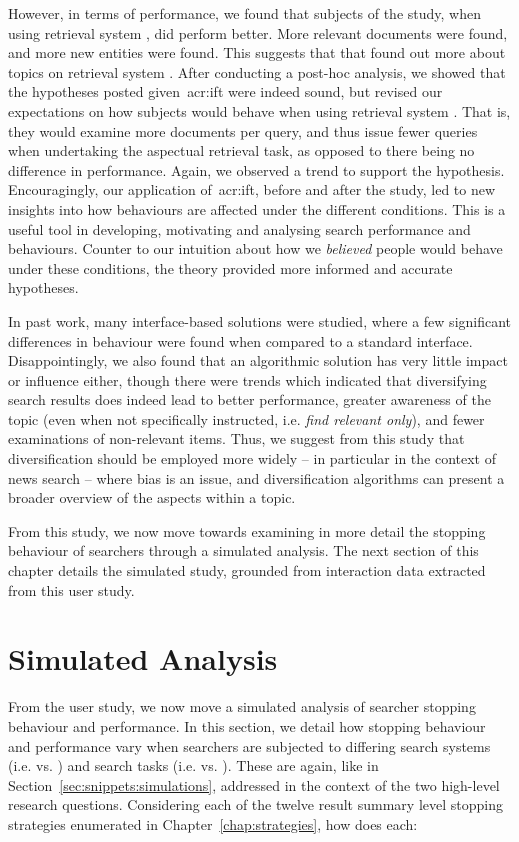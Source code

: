However, in terms of performance, we found that subjects of the study, when using retrieval system , did perform better. More relevant documents were found, and more new entities were found. This suggests that that found out more about topics on retrieval system . After conducting a post-hoc analysis, we showed that the hypotheses posted given~\gls{acr:ift} were indeed sound, but revised our expectations on how subjects would behave when using retrieval system . That is, they would examine more documents per query, and thus issue fewer queries when undertaking the aspectual retrieval task, as opposed to there being no difference in performance. Again, we observed a trend to support the hypothesis. Encouragingly, our application of~\gls{acr:ift}, before and after the study, led to new insights into how behaviours are affected under the different conditions. This is a useful tool in developing, motivating and analysing search performance and behaviours. Counter to our intuition about how we \emph{believed} people would behave under these conditions, the theory provided more informed and accurate hypotheses.

In past work, many interface-based solutions were studied, where a few significant differences in behaviour were found when compared to a standard interface. Disappointingly, we also found that an algorithmic solution has very little impact or influence either, though there were trends which indicated that diversifying search results does indeed lead to better performance, greater awareness of the topic (even when not specifically instructed, i.e. \emph{find relevant only}), and fewer examinations of non-relevant items. Thus, we suggest from this study that diversification should be employed more widely -- in particular in the context of news search -- where bias is an issue, and diversification algorithms can present a broader overview of the aspects within a topic.

From this study, we now move towards examining in more detail the stopping behaviour of searchers through a simulated analysis. The next section of this chapter details the simulated study, grounded from interaction data extracted from this user study.

\section{Simulated Analysis}\label{sec:diversity:simulated}
From the user study, we now move a simulated analysis of searcher stopping behaviour and performance. In this section, we detail how stopping behaviour and performance vary when searchers are subjected to differing search systems (i.e.  vs. ) and search tasks (i.e.  vs. ). These are again, like in Section~\ref{sec:snippets:simulations}, addressed in the context of the two high-level research questions. Considering each of the twelve result summary level stopping strategies enumerated in Chapter~\ref{chap:strategies}, how does each:

